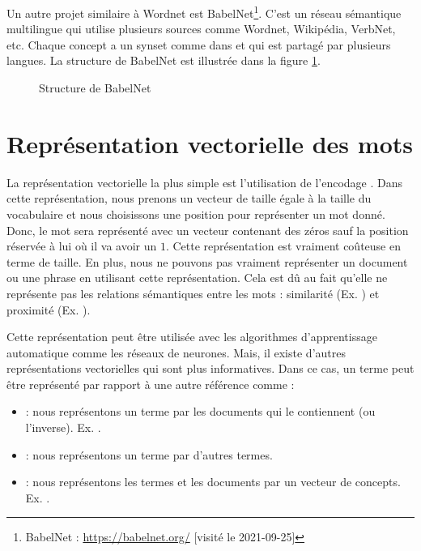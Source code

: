 \documentclass{KodeBook}
\begin{document}
Un autre projet similaire à Wordnet est BabelNet\footnote{BabelNet : \url{https://babelnet.org/} [visité le 2021-09-25]}.
C'est un réseau sémantique multilingue qui utilise plusieurs sources comme Wordnet, Wikipédia, VerbNet, etc. 
Chaque concept a un synset comme dans  et qui est partagé par plusieurs langues. 
La structure de BabelNet est illustrée dans la figure \ref{fig:babelnet-struc}.
\begin{figure}[ht]
	\caption[Structure de BabelNet]{Structure de BabelNet \cite{2012-navigli-ponzetto}}
	\label{fig:babelnet-struc}
\end{figure}

\section{Représentation vectorielle des mots}

La représentation vectorielle la plus simple est l'utilisation de l'encodage . 
Dans cette représentation, nous prenons un vecteur de taille égale à la taille du vocabulaire et nous choisissons une position pour représenter un mot donné. 
Donc, le mot sera représenté avec un vecteur contenant des zéros sauf la position réservée à lui où il va avoir un $1$. 
Cette représentation est vraiment coûteuse en terme de taille. 
En plus, nous ne pouvons pas vraiment représenter un document ou une phrase en utilisant cette représentation. 
Cela est dû au fait qu'elle ne représente pas les relations sémantiques entre les mots : similarité (Ex. ) et proximité (Ex. ). 

Cette représentation peut être utilisée avec les algorithmes d'apprentissage automatique comme les réseaux de neurones.
Mais, il existe d'autres représentations vectorielles qui sont plus informatives. 
Dans ce cas, un terme peut être représenté par rapport à une autre référence comme : 
\begin{itemize}
	\item {} : nous représentons un terme par les documents qui le contiennent (ou l'inverse).
	Ex. .
	
	\item {} : nous représentons un terme par d'autres termes.
	
	\item {} : nous représentons les termes et les documents par un vecteur de concepts.
	Ex. .
	
\end{itemize}
\end{document}
